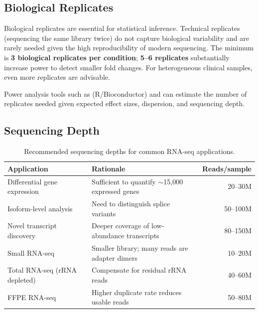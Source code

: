 \subsection{Biological Replicates}

\begin{keyconcept}[title={Replication is Non-Negotiable}]
Biological replicates are essential for statistical inference. Technical
replicates (sequencing the same library twice) do not capture biological
variability and are rarely needed given the high reproducibility of modern
sequencing. The minimum is \textbf{3 biological replicates per condition};
\textbf{5--6 replicates} substantially increase power to detect smaller fold
changes. For heterogeneous clinical samples, even more replicates are
advisable.
\end{keyconcept}

Power analysis tools such as  (R/Bioconductor) and
 can estimate the number of replicates needed given expected
effect sizes, dispersion, and sequencing depth.

\subsection{Sequencing Depth}

\begin{table}[htbp]
\centering
\caption{Recommended sequencing depths for common RNA-seq applications.}
\label{tab:rnaseq:depth}
\begin{tabularx}{\textwidth}{lXr}
\toprule
\textbf{Application} & \textbf{Rationale} & \textbf{Reads/sample} \\
\midrule
Differential gene expression & Sufficient to quantify $\sim$15,000 expressed genes & 20--30M \\
Isoform-level analysis & Need to distinguish splice variants & 50--100M \\
Novel transcript discovery & Deeper coverage of low-abundance transcripts & 80--150M \\
Small RNA-seq & Smaller library; many reads are adapter dimers & 10--20M \\
Total RNA-seq (rRNA depleted) & Compensate for residual rRNA reads & 40--60M \\
FFPE RNA-seq & Higher duplicate rate reduces usable reads & 50--80M \\
\bottomrule
\end{tabularx}
\end{table}

